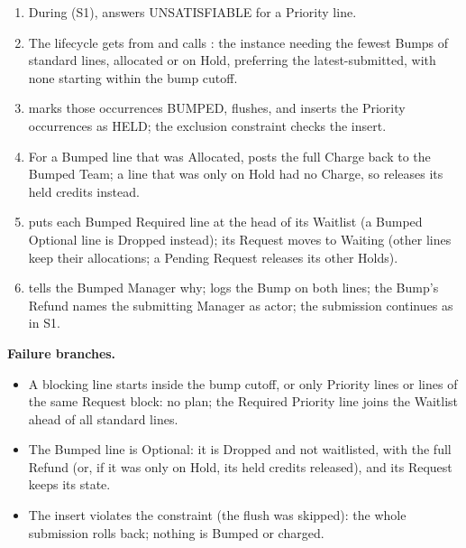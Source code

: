 \begin{enumerate}
\item During  (S1),  answers UNSATISFIABLE for a Priority line.
\item The lifecycle gets  from  and calls : the instance needing the fewest Bumps of standard lines, allocated or on Hold, preferring the latest-submitted, with none starting within the bump cutoff.
\item {} marks those occurrences BUMPED, flushes, and inserts the Priority occurrences as HELD; the exclusion constraint checks the insert.
\item For a Bumped line that was Allocated,  posts the full Charge back to the Bumped Team; a line that was only on Hold had no Charge, so  releases its held credits instead.
\item {} puts each Bumped Required line at the head of its Waitlist (a Bumped Optional line is Dropped instead); its Request moves to Waiting (other lines keep their allocations; a Pending Request releases its other Holds).
\item {} tells the Bumped Manager why;  logs the Bump on both lines; the Bump's Refund names the submitting Manager as actor; the submission continues as in S1.
\end{enumerate}
\par\textbf{Failure branches.}
\begin{itemize}
\item A blocking line starts inside the bump cutoff, or only Priority lines or lines of the same Request block: no plan; the Required Priority line joins the Waitlist ahead of all standard lines.
\item The Bumped line is Optional: it is Dropped and not waitlisted, with the full Refund (or, if it was only on Hold, its held credits released), and its Request keeps its state.
\item The insert violates the constraint (the flush was skipped): the whole submission rolls back; nothing is Bumped or charged.
\end{itemize}

